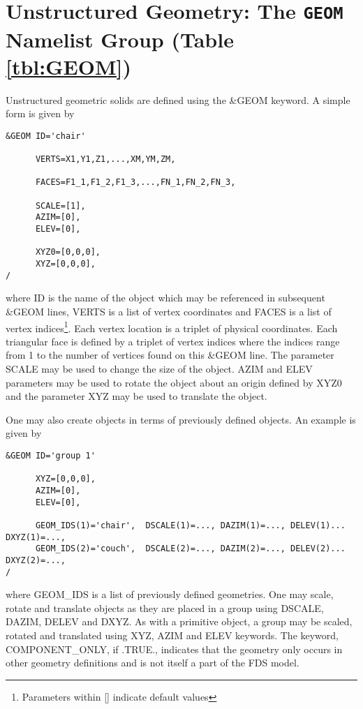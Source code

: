 \documentclass[12pt]{article}
\begin{document}
\vspace{1.0in}
\section{Unstructured Geometry: The \texorpdfstring{{\tt GEOM}}{GEOM} Namelist Group (Table \ref{tbl:GEOM})}
\label{info:GEOM}

Unstructured geometric solids are defined using the \&GEOM keyword.
A simple form is given by 

\begin{verbatim}
&GEOM ID='chair'

      VERTS=X1,Y1,Z1,...,XM,YM,ZM,

      FACES=F1_1,F1_2,F1_3,...,FN_1,FN_2,FN_3,

      SCALE=[1],
      AZIM=[0],
      ELEV=[0],

      XYZ0=[0,0,0],
      XYZ=[0,0,0],
/      
\end{verbatim}

\noindent where ID is the name of the object which may be referenced in subsequent \&GEOM lines, VERTS is a list of vertex coordinates and FACES is a list of vertex indices\footnote{Parameters within [] indicate default values}.  Each vertex location is a triplet of physical coordinates.  Each triangular face is defined by a triplet of vertex indices where the indices range from 1 to the number of vertices found on this \&GEOM line. The parameter SCALE may be used to change the size of the object. AZIM and ELEV parameters may be used to rotate the object about an origin defined by XYZ0 and the parameter XYZ may be used to translate the object.

One may also create objects in terms of previously defined objects.  An example is given by

\begin{verbatim}
&GEOM ID='group 1'

      XYZ=[0,0,0], 
      AZIM=[0],
      ELEV=[0],

      GEOM_IDS(1)='chair',  DSCALE(1)=..., DAZIM(1)=..., DELEV(1)... DXYZ(1)=...,
      GEOM_IDS(2)='couch',  DSCALE(2)=..., DAZIM(2)=..., DELEV(2)... DXYZ(2)=...,
/      
\end{verbatim}      

\noindent where GEOM\_IDS is a list of previously defined geometries.   One may scale, rotate and translate objects as they are placed in a group using DSCALE, DAZIM, DELEV and DXYZ.  As with a primitive object, a group may be scaled, rotated and translated using XYZ, AZIM and ELEV keywords.
The keyword, COMPONENT\_ONLY, if .TRUE., indicates that the geometry only occurs in other geometry definitions and is not itself a part of the FDS model.
\end{document}
